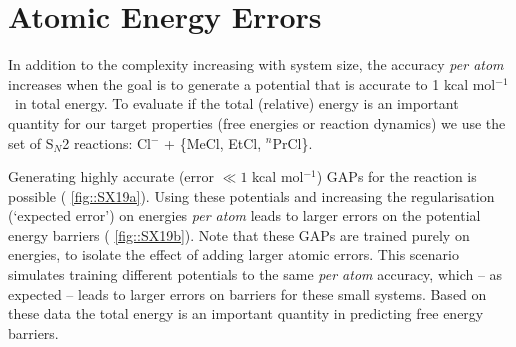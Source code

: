\documentclass[11pt]{article}
\numberwithin{equation}{subsection}
\newcommand{\kcal}{kcal mol$^{-1}$}
\begin{document}
\clearpage
\section{Atomic Energy Errors}

In addition to the complexity increasing with system size, the accuracy \emph{per atom} increases when the goal is to generate a potential that is accurate to 1 \kcal~in total energy. To evaluate if the total (relative) energy is an important quantity for our target properties (free energies or reaction dynamics) we use the set of S${}_N$2 reactions: Cl$^{-}$ + \{MeCl, EtCl, ${}^n$PrCl\}. 

Generating highly accurate (error $\ll 1$ \kcal) GAPs for the reaction is possible (\figurename{ \ref{fig::SX19a}}). Using these potentials and increasing the regularisation (`expected error') on energies \emph{per atom} leads to larger errors on the potential energy  barriers (\figurename{ \ref{fig::SX19b}}). Note that these GAPs are trained purely on energies, to isolate the effect of adding larger atomic errors. This scenario simulates training different potentials to the same \emph{per atom} accuracy, which -- as expected -- leads to larger errors on barriers for these small systems. Based on these data the total energy is an important quantity in predicting {\large {\color{red} free}} energy barriers.
\end{document}
